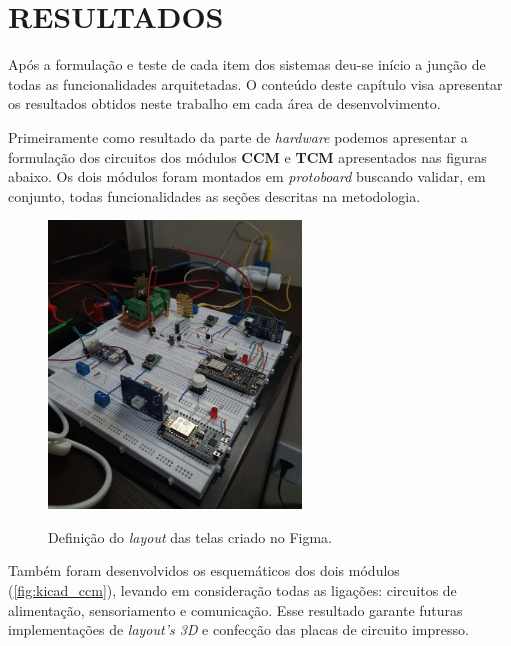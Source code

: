 
\chapter{RESULTADOS}
\label{chap:resultados}


Após a formulação e teste de cada item dos sistemas deu-se início a junção de todas as funcionalidades arquitetadas. O conteúdo deste capítulo visa apresentar os resultados obtidos neste trabalho em cada área de desenvolvimento.

Primeiramente como resultado da parte de \textit{hardware} podemos apresentar a formulação dos circuitos dos módulos \textbf{CCM} e \textbf{TCM} apresentados nas figuras abaixo. Os dois módulos foram montados em \textit{protoboard} buscando validar, em conjunto, todas funcionalidades as seções descritas na metodologia.


\begin{figure}[H]
	\centering
	\caption{Definição do \textit{layout} das telas criado no Figma.}
	\includegraphics[width=0.6\textwidth]{figuras/esquema_protoboard.jpg}
	\label{fig:figma_plan_desktop}
\end{figure}

Também foram desenvolvidos os esquemáticos dos dois módulos (\autoref{fig:kicad_ccm}), levando em consideração todas as ligações: circuitos de alimentação, sensoriamento e comunicação. Esse resultado garante futuras implementações de \textit{layout's 3D} e confecção das placas de circuito impresso.


